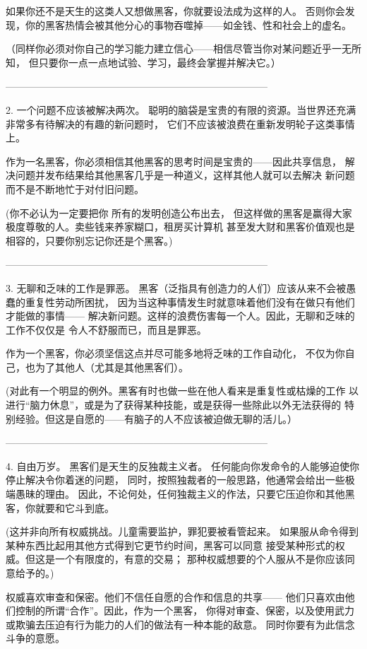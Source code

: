\documentclass[a4paper,12pt,UTF8,twoside]{ctexbook}
\begin{document}
如果你还不是天生的这类人又想做黑客，你就要设法成为这样的人。 否则你会发现，你的黑客热情会被其他分心的事物吞噬掉——如金钱、性和社会上的虚名。

（同样你必须对你自己的学习能力建立信心——相信尽管当你对某问题近乎一无所知， 但只要你一点一点地试验、学习，最终会掌握并解决它。）


--------------------------------------------------------------------------------

2. 一个问题不应该被解决两次。
聪明的脑袋是宝贵的有限的资源。当世界还充满非常多有待解决的有趣的新问题时， 它们不应该被浪费在重新发明轮子这类事情上。

作为一名黑客，你必须相信其他黑客的思考时间是宝贵的——因此共享信息， 解决问题并发布结果给其他黑客几乎是一种道义，这样其他人就可以去解决 新问题而不是不断地忙于对付旧问题。

(你不必认为一定要把你 所有的发明创造公布出去， 但这样做的黑客是赢得大家极度尊敬的人。卖些钱来养家糊口，租房买计算机 甚至发大财和黑客价值观也是相容的，只要你别忘记你还是个黑客。)


--------------------------------------------------------------------------------

3. 无聊和乏味的工作是罪恶。
黑客（泛指具有创造力的人们）应该从来不会被愚蠢的重复性劳动所困扰， 因为当这种事情发生时就意味着他们没有在做只有他们才能做的事情—— 解决新问题。这样的浪费伤害每一个人。因此，无聊和乏味的工作不仅仅是 令人不舒服而已，而且是罪恶。

作为一个黑客，你必须坚信这点并尽可能多地将乏味的工作自动化， 不仅为你自己，也为了其他人（尤其是其他黑客们）。

(对此有一个明显的例外。黑客有时也做一些在他人看来是重复性或枯燥的工作 以进行“脑力休息”，或是为了获得某种技能，或是获得一些除此以外无法获得的 特别经验。但这是自愿的——有脑子的人不应该被迫做无聊的活儿。）


--------------------------------------------------------------------------------

4. 自由万岁。
黑客们是天生的反独裁主义者。 任何能向你发命令的人能够迫使你停止解决令你着迷的问题， 同时，按照独裁者的一般思路，他通常会给出一些极端愚昧的理由。 因此，不论何处，任何独裁主义的作法，只要它压迫你和其他黑客，你就要和它斗到底。

(这并非向所有权威挑战。儿童需要监护，罪犯要被看管起来。 如果服从命令得到某种东西比起用其他方式得到它更节约时间，黑客可以同意 接受某种形式的权威。但这是一个有限度的，有意的交易； 那种权威想要的个人服从不是你应该同意给予的。)

权威喜欢审查和保密。他们不信任自愿的合作和信息的共享—— 他们只喜欢由他们控制的所谓“合作”。因此，作为一个黑客， 你得对审查、保密，以及使用武力或欺骗去压迫有行为能力的人们的做法有一种本能的敌意。 同时你要有为此信念斗争的意愿。
\end{document}
